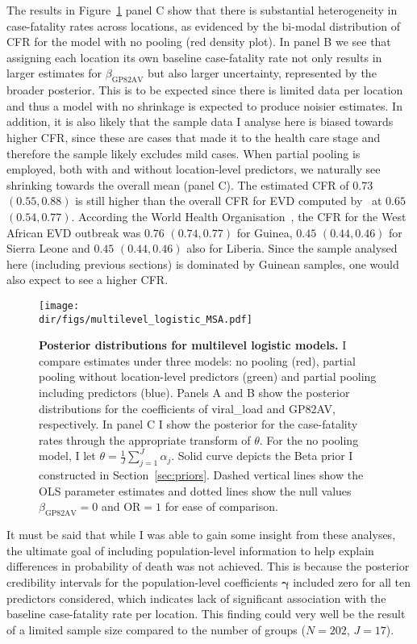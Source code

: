 The results in Figure~\ref{fig:multilevel} panel C show that there is substantial heterogeneity in case-fatality rates across locations, as evidenced by the bi-modal distribution of CFR for the model with no pooling (red density plot).
In panel B we see that assigning each location its own baseline case-fatality rate not only results in larger estimates for $\beta_{\text{GP82AV}}$ but also larger uncertainty, represented by the broader posterior.
This is to be expected since there is limited data per location and thus a model with no shrinkage is expected to produce noisier estimates. 
In addition, it is also likely that the sample data I analyse here is biased towards higher CFR, since these are cases that made it to the health care stage and therefore the sample likely excludes mild cases.
When partial pooling is employed, both with and without location-level predictors, we naturally see shrinking towards the overall mean (panel C).
The estimated CFR of $0.73$ $(0.55, 0.88)$ is still higher than the overall CFR for EVD computed by~\cite{Nyakarahuka2016} at $0.65$ $(0.54, 0.77)$.
According the World Health Organisation~\citep{WHO_2016b}, the CFR for the West African EVD outbreak was $0.76$ $(0.74, 0.77)$ for Guinea, $0.45$ $(0.44, 0.46)$ for Sierra Leone and $0.45$ $(0.44, 0.46)$ also for Liberia.
Since the sample analysed here (including previous sections) is dominated by Guinean samples, one would also expect to see a higher CFR.

\begin{figure}[!ht]
  \centering
  \texttt{[image: \\dir/figs/multilevel\_logistic\_MSA.pdf]}
\caption[Posterior distributions for multilevel logistic models.]{\textbf{Posterior distributions for multilevel logistic models.}
I compare estimates under three models: no pooling (red), partial pooling without location-level predictors (green) and partial pooling including predictors (blue).
Panels A and B show the posterior distributions for the coefficients of viral\_load and GP82AV, respectively.
In panel C I show the posterior for the case-fatality rates through the appropriate transform of $\theta$.
For the no pooling model, I let $\theta = \frac{1}{J}\sum_{j=1}^J \alpha_j$.
Solid curve depicts the Beta prior I constructed in Section~\ref{sec:priors}.
Dashed vertical lines show the OLS parameter estimates and dotted lines show the null values $\beta_{\text{GP82AV}} = 0$ and $\text{OR} = 1$ for ease of comparison.
}
\label{fig:multilevel}
\end{figure}

It must be said that while I was able to gain some insight from these analyses, the ultimate goal of including population-level information to help explain differences in probability of death was not achieved.
This is because the posterior credibility intervals for the population-level coefficients $\boldsymbol\gamma$ included zero for all ten predictors considered, which indicates lack of significant association with the baseline case-fatality rate per location.
This finding could very well be the result of a limited sample size compared to the number of groups ($N = 202$, $J = 17$).

